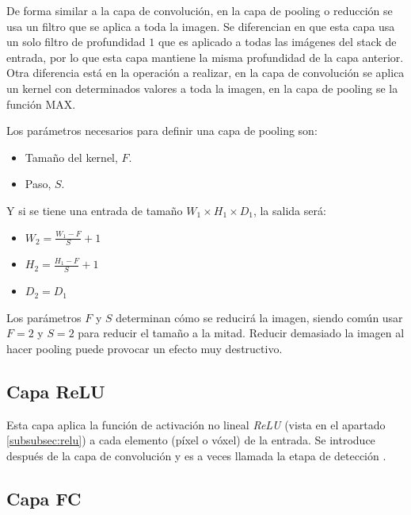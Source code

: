 De forma similar a la capa de convolución, en la capa de pooling o reducción se usa un filtro que se aplica a toda la imagen. Se diferencian en que esta capa usa un solo filtro de profundidad $1$ que es aplicado a todas las imágenes del stack de entrada, por lo que esta capa mantiene la misma profundidad de la capa anterior. Otra diferencia está en la operación a realizar, en la capa de convolución se aplica un kernel con determinados valores a toda la imagen, en la capa de pooling se la función MAX.

Los parámetros necesarios para definir una capa de pooling son:
\begin{itemize}
\item Tamaño del kernel, $F$.
\item Paso, $S$.
\end{itemize} 

Y si se tiene una entrada de tamaño $W_1 \times H_1 \times D_1$, la salida será:
\begin{itemize}
\item $W_2 = \frac{W_1 - F}{S} + 1$
\item $H_2 = \frac{H_1 - F}{S} + 1$
\item $D_2 = D_1$
\end{itemize}

Los parámetros $F$ y $S$ determinan cómo se reducirá la imagen, siendo común usar $F=2$ y $S=2$ para reducir el tamaño a la mitad. Reducir demasiado la imagen al hacer pooling puede provocar un efecto muy destructivo.


\subsection{Capa ReLU}\label{cnn_capa_relu}

Esta capa aplica la función de activación no lineal \textit{ReLU} (vista en el apartado \ref{subsubsec:relu}) a cada elemento (píxel o vóxel) de la entrada. Se introduce después de la capa de convolución y es a veces llamada la etapa de detección \cite[335]{Goodfellow2016}.

\subsection{Capa FC}\label{cnn_capa_fc}

